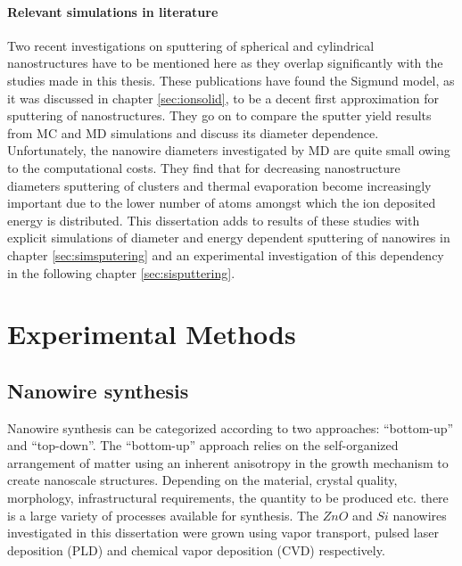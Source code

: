 \subsubsection{Relevant simulations in literature}

Two recent investigations on sputtering of spherical \cite{nietiadi_sputtering_2014} and cylindrical \cite{urbassek_sputter_2015} nanostructures have to be mentioned here as they overlap significantly with the studies made in this thesis. These publications have found the Sigmund model, as it was discussed in chapter \ref{sec:ionsolid}, to be a decent first approximation for sputtering of nanostructures. They go on to compare the sputter yield results from MC and MD simulations and discuss its diameter dependence. Unfortunately, the nanowire diameters investigated by MD are quite small owing to the computational costs. They find that for decreasing nanostructure diameters sputtering of clusters and thermal evaporation become increasingly important due to the lower number of atoms amongst which the ion deposited energy is distributed. This dissertation adds to results of these studies with explicit simulations of diameter and energy dependent sputtering of nanowires in chapter \ref{sec:simsputering} and an experimental investigation of this dependency in the following chapter \ref{sec:sisputtering}.


\chapter{Experimental Methods}

\section{Nanowire synthesis}

Nanowire synthesis can be categorized according to two approaches: ``bottom-up'' and ``top-down''. The ``bottom-up'' approach relies on the self-organized arrangement of matter using an inherent anisotropy in the growth mechanism to create nanoscale structures. Depending on the material, crystal quality, morphology, infrastructural requirements, the quantity to be produced etc. there is a large variety of processes available for synthesis. The $ZnO$ \cite{borchers_catalyst_2006, stichtenoth_dimensionseffekte_2008, muller_structural_2009,cao_tuning_2010,ogrisek_kontrolliertes_2013} and $Si$ \cite{lugstein_pressure-induced_2008} nanowires investigated in this dissertation were grown using vapor transport, pulsed laser deposition (PLD) and chemical vapor deposition (CVD) respectively. 

